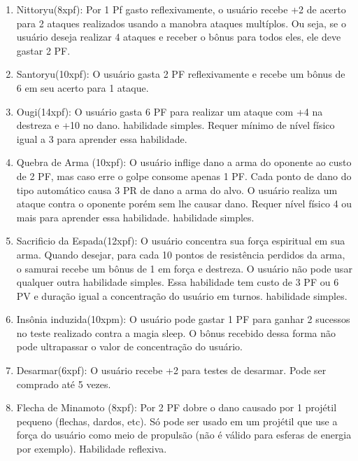 \begin{enumerate}
	\item Nittoryu(8xpf): Por 1 Pf gasto reflexivamente, o usuário recebe +2 de acerto para 2 ataques realizados usando a manobra ataques multíplos. Ou seja, se o usuário deseja realizar 4 ataques e receber o bônus para todos eles, ele deve gastar 2 PF.
	
	\item Santoryu(10xpf): O usuário gasta 2 PF reflexivamente e recebe um bônus de 6 em seu acerto para 1 ataque. 
	
	\item Ougi(14xpf): O usuário gasta 6 PF para realizar um ataque com +4 na destreza e +10 no dano. habilidade simples. Requer mínimo de nível físico igual a 3 para aprender essa habilidade.


	\item Quebra de Arma (10xpf): O usuário inflige dano a arma do oponente ao custo de 2 PF, mas caso erre o golpe consome apenas 1 PF. Cada ponto de dano do tipo automático causa 3 PR de dano a arma do alvo. O usuário realiza um ataque contra o oponente porém sem lhe causar dano. Requer nível físico 4 ou mais para aprender essa habilidade. habilidade simples.

	\item Sacrificio da Espada(12xpf): O usuário concentra sua força espiritual em sua arma. Quando desejar, para cada 10 pontos de resistência perdidos da arma, o samurai recebe um bônus de 1 em força e destreza. O usuário não pode usar qualquer outra habilidade simples. Essa habilidade tem custo de 3 PF ou 6 PV e duração igual a concentração do usuário em turnos. habilidade simples. 
	
	\item Insônia induzida(10xpm): O usuário pode gastar 1 PF para ganhar 2 sucessos no teste realizado contra a magia sleep. O bônus recebido dessa forma não pode ultrapassar o valor de concentração do usuário.
		
 	\item Desarmar(6xpf): O usuário recebe +2 para testes de desarmar. Pode ser comprado até 5 vezes.

	\item Flecha de Minamoto (8xpf): Por 2 PF dobre o dano causado por 1 projétil pequeno (flechas, dardos, etc). Só pode ser usado em um projétil que use a força do usuário como meio de propulsão (não é válido para esferas de energia por exemplo). Habilidade reflexiva.	
	

\end{enumerate}
